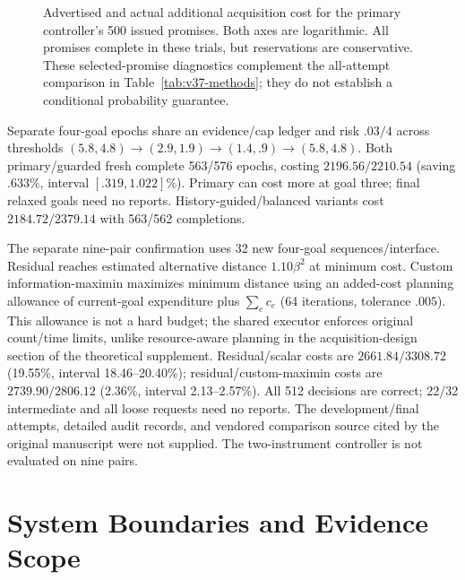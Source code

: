 \begin{figure}[t]
\centering
\resizebox{\columnwidth}{!}{}
\caption{Advertised and actual additional acquisition cost for the primary controller's 500 issued promises. Both axes are logarithmic. All promises complete in these trials, but reservations are conservative. These selected-promise diagnostics complement the all-attempt comparison in Table~\ref{tab:v37-methods}; they do not establish a conditional probability guarantee.}
\label{fig:v37-promises}
\end{figure}
Separate four-goal epochs share an evidence/cap ledger and risk $.03/4$ across thresholds $(5.8,4.8)\to(2.9,1.9)\to(1.4,.9)\to(5.8,4.8)$. Both primary/guarded fresh complete 563/576 epochs, costing $2196.56/2210.54$ (saving $.633\%$, interval $[.319,1.022]\%$). Primary can cost more at goal three; final relaxed goals need no reports. History-guided/balanced variants cost $2184.72/2379.14$ with 563/562 completions.

The separate nine-pair confirmation uses 32 new four-goal sequences/interface. Residual reaches estimated alternative distance $1.10\beta^2$ at minimum cost. Custom information-maximin maximizes minimum distance using an added-cost planning allowance of current-goal expenditure plus $\sum_ec_e$ (64 iterations, tolerance $.005$). This allowance is not a hard budget; the shared executor enforces original count/time limits, unlike resource-aware planning in the acquisition-design section of the theoretical supplement. Residual/scalar costs are $2661.84/3308.72$ (19.55\%, interval 18.46--20.40\%); residual/custom-maximin costs are $2739.90/2806.12$ (2.36\%, interval 2.13--2.57\%). All 512 decisions are correct; 22/32 intermediate and all loose requests need no reports. The development/final attempts, detailed audit records, and vendored comparison source cited by the original manuscript were not supplied. The two-instrument controller is not evaluated on nine pairs.

\section{System Boundaries and Evidence Scope}
